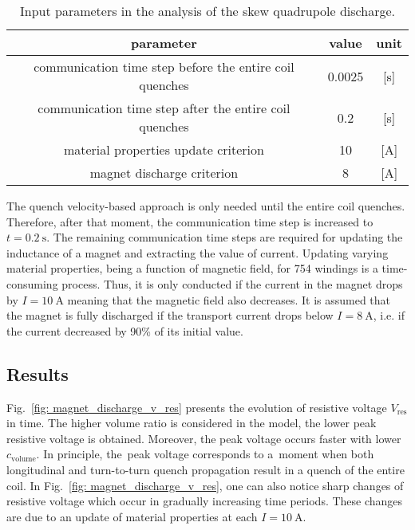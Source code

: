 \begin{table}[H]
    \caption{Input parameters in the analysis of the skew quadrupole discharge.} 
    \vspace{-1.em} 
    \fontsize{10}{10}
    \selectfont 
    \renewcommand{\arraystretch}{1.5}
    \begin{center}
        \begin{tabular}{ ccc }  
        \hline
        parameter & value & unit \\
        \hline
        communication time step before the entire coil quenches & 0.0025 & [s] \\
        communication time step after the entire coil quenches & 0.2 & [s] \\ 
        material properties update criterion & 10 & [A] \\ 
        magnet discharge criterion & 8 & [A] \\
        \hline 
        \end{tabular}
    \end{center}  
     \label{table: skew_quad_discharge_input_params} 
 \end{table}

The quench velocity-based approach is only needed until the entire coil quenches. Therefore, after that moment, the communication time step is increased to $t=0.2~\text{s}$. The remaining communication time steps are required for updating the inductance of a magnet and extracting the value of current. Updating varying material properties, being a function of magnetic field, for 754 windings is a time-consuming process. Thus, it is only conducted if the current in the magnet drops by $I=10~\text{A}$ meaning that the magnetic field also decreases. It is assumed that the magnet is fully discharged if the transport current drops below $I=8~\text{A}$, i.e. if the current decreased by 90\% of its initial value.

\subsection{Results}

Fig.~\ref{fig: magnet_discharge_v_res} presents the evolution of resistive voltage $V_\text{res}$ in time. The higher volume ratio is considered in the model, the lower peak resistive voltage is obtained. Moreover, the peak voltage occurs faster with lower $c_\text{volume}$. In principle, the~peak voltage corresponds to a~moment when both longitudinal and turn-to-turn quench propagation result in a quench of the entire coil. In Fig.~\ref{fig: magnet_discharge_v_res}, one can also notice sharp changes of resistive voltage which occur in gradually increasing time periods. These changes are due to an update of material properties at each $I=10~\text{A}$.

